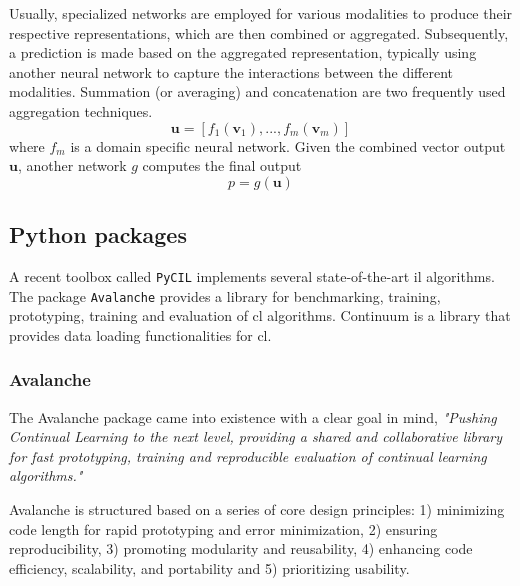 Usually, specialized networks are employed for various modalities to produce their respective representations, which are then combined or aggregated. Subsequently, a prediction is made based on the aggregated representation, typically using another neural network to capture the interactions between the different modalities. Summation (or averaging) and concatenation are two frequently used aggregation techniques. 
\[
\mathbf{u} = \left[ f_{1}(\mathbf{v}_{1}), ..., f_{m}(\mathbf{v}_{m}) \right]
\]
where $f_{m}$ is a domain specific neural network. 
Given the combined vector output $\mathbf{u}$, another network $g$ computes the final output
\[
p = g(\mathbf{u})
\]

\citep{liu2018learn, gadzicki2020early, wang2022comprehensive}




\subsection{Python packages}
A recent toolbox called \verb|PyCIL| \citep{zhou2023class, zhou2023pycil} implements several state-of-the-art \acrshort{il} algorithms. The package \verb|Avalanche| \citep{lomonaco2021avalanche} provides a library for benchmarking, training, prototyping, training and evaluation of \acrshort{cl} algorithms. Continuum \citep{douillard2021continuum} is a library that provides data loading functionalities for \acrshort{cl}. 

\subsubsection{Avalanche}
\label{sec:avalanche}
The Avalanche package came into existence with a clear goal in mind, \textit{"Pushing Continual Learning to the next level, providing a shared and collaborative library for fast prototyping, training and reproducible evaluation of continual learning algorithms."} \citep{avalancheContinualAIFiveMinutes}

Avalanche is structured based on a series of core design principles: 1) minimizing code length for rapid prototyping and error minimization, 2) ensuring reproducibility, 3) promoting modularity and reusability, 4) enhancing code efficiency, scalability, and portability and 5) prioritizing usability.


